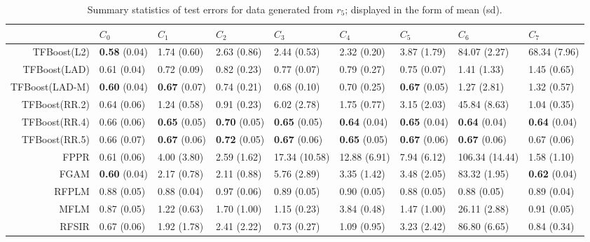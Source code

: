 \begin{table}[H]
\centering
\begin{tabular}{rllllllll}
  \hline
 & $C_0$ & $C_1$ & $C_2$ & $C_3$ & $C_4$ & $C_5$ & $C_6$ & $C_7$ \\ 
  \hline
TFBoost(L2) & \textbf{0.58} (0.04) & 1.74 (0.60) & 2.63 (0.86) & 2.44 (0.53) & 2.32 (0.20) & 3.87 (1.79) & 84.07 (2.27) & 68.34 (7.96) \\ 
  TFBoost(LAD) & 0.61 (0.04) & 0.72 (0.09) & 0.82 (0.23) & 0.77 (0.07) & 0.79 (0.27) & 0.75 (0.07) & 1.41 (1.33) & 1.45 (0.65) \\ 
  TFBoost(LAD-M) & \textbf{0.60} (0.04) & \textbf{0.67} (0.07) & 0.74 (0.21) & 0.68 (0.10) & 0.70 (0.25) & \textbf{0.67} (0.05) & 1.27 (2.81) & 1.32 (0.57) \\ 
  TFBoost(RR.2) & 0.64 (0.06) & 1.24 (0.58) & 0.91 (0.23) & 6.02 (2.78) & 1.75 (0.77) & 3.15 (2.03) & 45.84 (8.63) & 1.04 (0.35) \\ 
  TFBoost(RR.4) & 0.66 (0.06) & \textbf{0.65} (0.05) & \textbf{0.70} (0.05) & \textbf{0.65} (0.05) & \textbf{0.64} (0.04) & \textbf{0.65} (0.04) & \textbf{0.64} (0.04) & \textbf{0.64} (0.04) \\ 
  TFBoost(RR.5) & 0.66 (0.07) & \textbf{0.67} (0.06) & \textbf{0.72} (0.05) & \textbf{0.67} (0.06) & \textbf{0.65} (0.05) & \textbf{0.67} (0.06) & \textbf{0.67} (0.06) & 0.67 (0.06) \\ 
  FPPR & 0.61 (0.06) & 4.00 (3.80) & 2.59 (1.62) & 17.34 (10.58) & 12.88 (6.91) & 7.94 (6.12) & 106.34 (14.44) & 1.58 (1.10) \\ 
  FGAM & \textbf{0.60} (0.04) & 2.17 (0.78) & 2.11 (0.88) & 5.76 (2.89) & 3.35 (1.42) & 3.48 (2.05) & 83.32 (1.95) & \textbf{0.62} (0.04) \\ 
  RFPLM & 0.88 (0.05) & 0.88 (0.04) & 0.97 (0.06) & 0.89 (0.05) & 0.90 (0.05) & 0.88 (0.05) & 0.88 (0.05) & 0.89 (0.04) \\ 
  MFLM & 0.87 (0.05) & 1.22 (0.63) & 1.70 (1.00) & 1.15 (0.23) & 3.84 (0.48) & 1.47 (1.00) & 26.11 (2.88) & 0.91 (0.05) \\ 
  RFSIR & 0.67 (0.06) & 1.92 (1.78) & 2.41 (2.22) & 0.73 (0.27) & 1.09 (0.95) & 3.23 (2.42) & 86.80 (6.65) & 0.84 (0.34) \\ 
   \hline
\end{tabular}
\caption{Summary statistics of test errors for data generated from $r_5$; displayed in the form of mean (sd).} 
\end{table}
